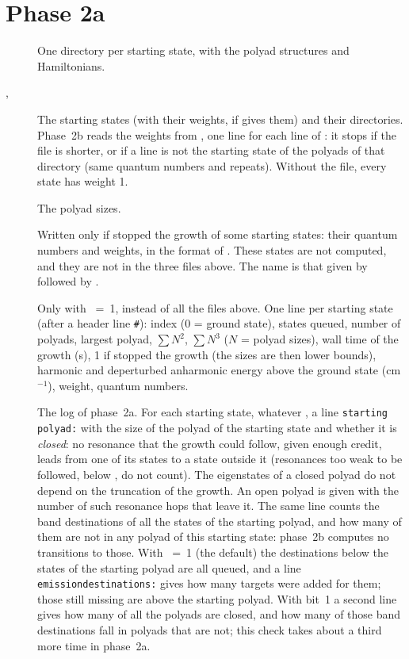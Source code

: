 \section{Phase 2a}\label{sec:out-2a}
\begin{description}
\item[] One directory per starting state, with the
  polyad structures and Hamiltonians.
\item[, ] The starting states
  (with their weights, if  gives them) and their
  directories. Phase~2b reads the weights from ,
  one line for each line of : it stops if the file is
  shorter, or if a line is not the starting state of the polyads of that
  directory (same quantum numbers and repeats). Without the file, every
  state has weight 1.
\item[] The polyad sizes.
\item[] Written only if 
  stopped the growth of some starting states: their quantum numbers and
  weights, in the format of . These states are not
  computed, and they are not in the three files above. The name is that
  given by  followed by .
\item[] Only with ~=~1, instead of all
  the files above. One line per starting state (after a header line
  \texttt{\#}): index (0 = ground state), states queued, number of
  polyads, largest polyad, $\sum N^2$, $\sum N^3$ ($N$ = polyad sizes),
  wall time of the growth (s), 1 if  stopped the growth (the
  sizes are then lower bounds), harmonic and deperturbed anharmonic energy
  above the ground state (cm$^{-1}$), weight, quantum numbers.
\item[] The log of phase~2a. For each starting
  state, whatever , a line \texttt{starting polyad:} with
  the size of the polyad of the starting state and whether it is
  \emph{closed}: no resonance that the growth could follow, given enough
  credit, leads from one of its states to a state outside it (resonances
  too weak to be followed, below , do not count). The
  eigenstates of a closed polyad do not depend on the truncation of the
  growth. An open polyad is given with the number of such resonance hops
  that leave it. The same line counts the band destinations of all the
  states of the starting polyad, and how many of them are not in any polyad
  of this starting state: phase~2b computes no transitions to those. With
  ~=~1 (the default) the destinations below the
  states of the starting polyad are all queued, and a line
  \texttt{emissiondestinations:} gives how many targets were added for
  them; those still missing are above the starting polyad. With
   bit~1 a second line gives how many of all the polyads are
  closed, and how many of those band destinations fall in polyads that are
  not; this check takes about a third more time in phase~2a.


\end{description}
